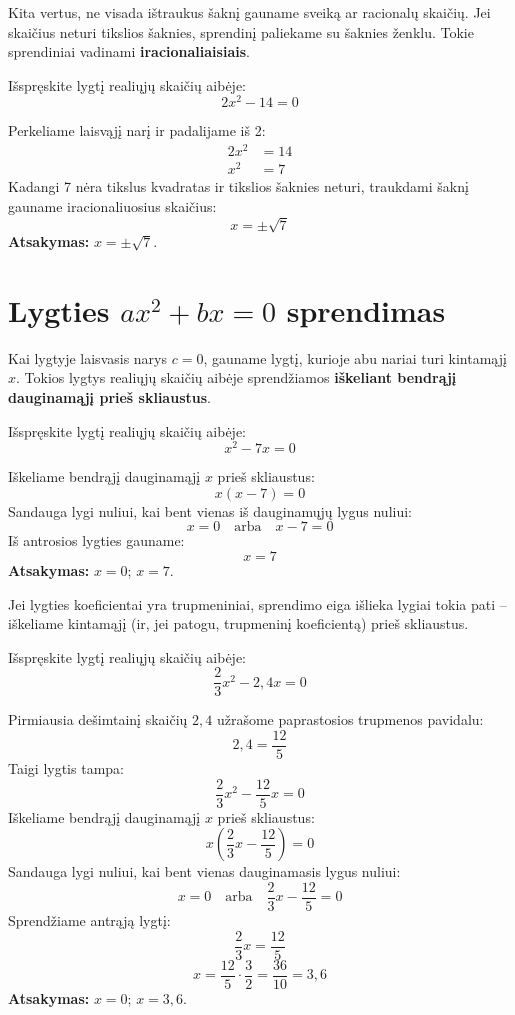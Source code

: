 \documentclass[11pt,a4paper]{scrartcl}
\begin{document}
Kita vertus, ne visada ištraukus šaknį gauname sveiką ar racionalų skaičių. Jei skaičius neturi tikslios šaknies, sprendinį paliekame su šaknies ženklu. Tokie sprendiniai vadinami \textbf{iracionaliaisiais}.

\begin{example}
Išspręskite lygtį realiųjų skaičių aibėje:
\[ 2x^2 - 14 = 0 \]
\end{example}
\begin{solution}
Perkeliame laisvąjį narį ir padalijame iš 2:
\[
\begin{aligned}
2x^2 &= 14 \\
x^2 &= 7
\end{aligned}
\]
Kadangi 7 nėra tikslus kvadratas ir tikslios šaknies neturi, traukdami šaknį gauname iracionaliuosius skaičius:
\[ x = \pm\sqrt{7} \]
\textbf{Atsakymas:} $x = \pm\sqrt{7}$.
\end{solution}

\section{Lygties $ax^2+bx=0$ sprendimas}

Kai lygtyje laisvasis narys $c=0$, gauname lygtį, kurioje abu nariai turi kintamąjį $x$. Tokios lygtys realiųjų skaičių aibėje sprendžiamos \textbf{iškeliant bendrąjį dauginamąjį prieš skliaustus}.

\begin{example}
Išspręskite lygtį realiųjų skaičių aibėje:
\[ x^2 - 7x = 0 \]
\end{example}
\begin{solution}
Iškeliame bendrąjį dauginamąjį $x$ prieš skliaustus:
\[ x(x - 7) = 0 \]
Sandauga lygi nuliui, kai bent vienas iš dauginamųjų lygus nuliui:
\[ x = 0 \quad \text{arba} \quad x - 7 = 0 \]
Iš antrosios lygties gauname:
\[ x = 7 \]
\textbf{Atsakymas:} $x = 0$; $x = 7$.
\end{solution}

Jei lygties koeficientai yra trupmeniniai, sprendimo eiga išlieka lygiai tokia pati – iškeliame kintamąjį (ir, jei patogu, trupmeninį koeficientą) prieš skliaustus.

\begin{example}
Išspręskite lygtį realiųjų skaičių aibėje:
\[ \frac{2}{3}x^2 - 2,4x = 0 \]
\end{example}
\begin{solution}
Pirmiausia dešimtainį skaičių $2,4$ užrašome paprastosios trupmenos pavidalu:
\[ 2,4 = \frac{12}{5} \]
Taigi lygtis tampa:
\[ \frac{2}{3}x^2 - \frac{12}{5}x = 0 \]
Iškeliame bendrąjį dauginamąjį $x$ prieš skliaustus:
\[ x\left( \frac{2}{3}x - \frac{12}{5} \right) = 0 \]
Sandauga lygi nuliui, kai bent vienas dauginamasis lygus nuliui:
\[ x = 0 \quad \text{arba} \quad \frac{2}{3}x - \frac{12}{5} = 0 \]
Sprendžiame antrąją lygtį:
\[ \frac{2}{3}x = \frac{12}{5} \]
\[ x = \frac{12}{5} \cdot \frac{3}{2} = \frac{36}{10} = 3,6 \]
\textbf{Atsakymas:} $x = 0$; $x = 3,6$.
\end{solution}
\end{document}

